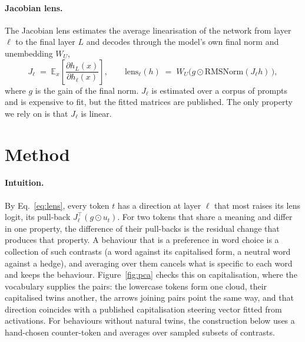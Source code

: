\documentclass{article}
\begin{document}
\paragraph{Jacobian lens.}
The Jacobian lens \citep{gurnee2026workspace} estimates the average linearisation of the network from layer $\ell$ to the final layer $L$ and decodes through the model's own final norm and unembedding $W_U$,
\begin{equation}
  J_\ell \;=\; \mathbb{E}_x\!\left[\frac{\partial h_L(x)}{\partial h_\ell(x)}\right],
  \qquad
  \mathrm{lens}_\ell(h) \;=\; W_U\big(g \odot \mathrm{RMSNorm}(J_\ell h)\,\big),
  \label{eq:lens}
\end{equation}
where $g$ is the gain of the final norm. $J_\ell$ is estimated over a corpus of prompts and is expensive to fit, but the fitted matrices are published. The only property we rely on is that $J_\ell$ is linear.

\section{Method}

\paragraph{Intuition.}
By Eq.~\ref{eq:lens}, every token $t$ has a direction at layer $\ell$ that most raises its lens logit, its pull-back $J_\ell^\top (g \odot u_t)$. For two tokens that share a meaning and differ in one property, the difference of their pull-backs is the residual change that produces that property. A behaviour that is a preference in word choice is a collection of such contrasts (a word against its capitalised form, a neutral word against a hedge), and averaging over them cancels what is specific to each word and keeps the behaviour. Figure~\ref{fig:pca} checks this on capitalisation, where the vocabulary supplies the pairs: the lowercase tokens form one cloud, their capitalised twins another, the arrows joining pairs point the same way, and that direction coincides with a published capitalisation steering vector fitted from activations. For behaviours without natural twins, the construction below uses a hand-chosen counter-token and averages over sampled subsets of contrasts.
\end{document}
